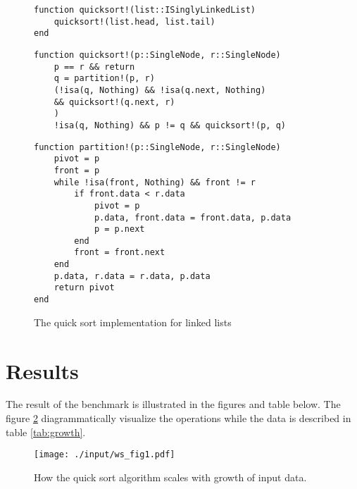 \documentclass[a4paper, 11pt]{article}
\begin{document}
    \begin{figure}[h]
        \centering
    \begin{verbatim}
function quicksort!(list::ISinglyLinkedList) 
    quicksort!(list.head, list.tail)
end
    \end{verbatim}
    \begin{verbatim}
function quicksort!(p::SingleNode, r::SingleNode)
    p == r && return 
    q = partition!(p, r)
    (!isa(q, Nothing) && !isa(q.next, Nothing) 
    && quicksort!(q.next, r)
    )
    !isa(q, Nothing) && p != q && quicksort!(p, q)
    \end{verbatim}
    \begin{verbatim}
function partition!(p::SingleNode, r::SingleNode)
    pivot = p
    front = p
    while !isa(front, Nothing) && front != r
        if front.data < r.data
            pivot = p
            p.data, front.data = front.data, p.data
            p = p.next
        end
        front = front.next
    end
    p.data, r.data = r.data, p.data
    return pivot
end
    \end{verbatim}
    \caption{The quick sort implementation for linked lists}
    \label{code:qslist} %
    \end{figure}

\clearpage
    \section*{Results}
    \label{sec:results}
    The result of the benchmark is illustrated in the figures and table below.
    The figure \ref{fig:fig1} diagrammatically visualize the operations while the
    data is described in table \ref{tab:growth}.

    \begin{figure}[h] %
        \centering
        \texttt{[image: ./input/ws\_fig1.pdf]} %
        \caption{How the quick sort algorithm scales with growth of input data.}%
        \label{fig:fig1} %
    \end{figure}
\end{document}
